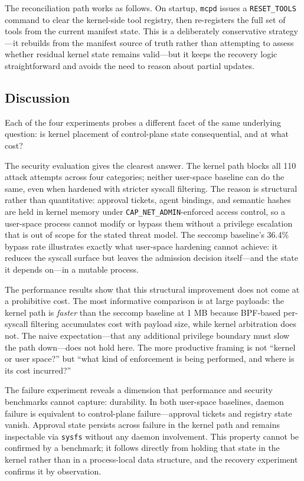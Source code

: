 The reconciliation path works as follows. On startup, \texttt{mcpd} issues a \texttt{RESET\_TOOLS} command to clear the kernel-side tool registry, then re-registers the full set of tools from the current manifest state. This is a deliberately conservative strategy---it rebuilds from the manifest source of truth rather than attempting to assess whether residual kernel state remains valid---but it keeps the recovery logic straightforward and avoids the need to reason about partial updates.


\subsection{Discussion}

Each of the four experiments probes a different facet of the same underlying question: is kernel placement of control-plane state consequential, and at what cost?

The security evaluation gives the clearest answer. The kernel path blocks all 110 attack attempts across four categories; neither user-space baseline can do the same, even when hardened with stricter syscall filtering. The reason is structural rather than quantitative: approval tickets, agent bindings, and semantic hashes are held in kernel memory under \texttt{CAP\_NET\_ADMIN}-enforced access control, so a user-space process cannot modify or bypass them without a privilege escalation that is out of scope for the stated threat model. The seccomp baseline's 36.4\% bypass rate illustrates exactly what user-space hardening cannot achieve: it reduces the syscall surface but leaves the admission decision itself---and the state it depends on---in a mutable process.

The performance results show that this structural improvement does not come at a prohibitive cost. The most informative comparison is at large payloads: the kernel path is \emph{faster} than the seccomp baseline at 1 MB because BPF-based per-syscall filtering accumulates cost with payload size, while kernel arbitration does not. The naive expectation---that any additional privilege boundary must slow the path down---does not hold here. The more productive framing is not ``kernel or user space?'' but ``what kind of enforcement is being performed, and where is its cost incurred?''

The failure experiment reveals a dimension that performance and security benchmarks cannot capture: durability. In both user-space baselines, daemon failure is equivalent to control-plane failure---approval tickets and registry state vanish. Approval state persists across failure in the kernel path and remains inspectable via \texttt{sysfs} without any daemon involvement. This property cannot be confirmed by a benchmark; it follows directly from holding that state in the kernel rather than in a process-local data structure, and the recovery experiment confirms it by observation.


